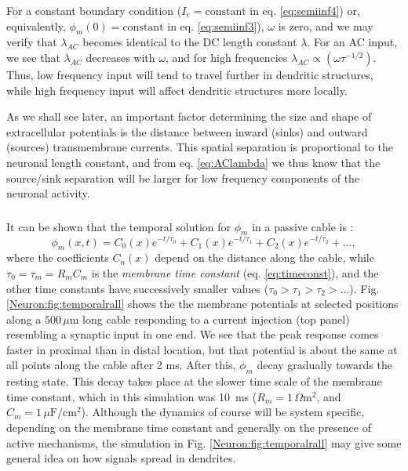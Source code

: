 For a constant boundary condition ($I_e = \text{constant}$ in eq. \ref{eq:semiinf4}) or, equivalently, $\phi_m(0) = \text{constant}$ in eq. \ref{eq:semiinf3}), $\omega$ is zero, and we may verify that $\lambda_{AC}$ becomes identical to the DC length constant $\lambda$. For an AC input, we see that $\lambda_{AC}$ decreases with $\omega$, and for high frequencies $\lambda_{AC} \propto (\omega \tau^{-1/2})$. Thus, low frequency input will tend to travel further in dendritic structures, while high frequency input will affect dendritic structures more locally. 

As we shall see later, an important factor determining the size and shape of extracellular potentials is the distance between inward (sinks) and outward (sources) transmembrane currents. This spatial separation is proportional to the neuronal length constant, and from eq. \ref{eq:AClambda} we thus know that the source/sink separation will be larger for low frequency components of the neuronal activity.


\subsubsection{}
It can be shown that the temporal solution for $\phi_m$ in a passive cable is \cite{rall1969}:
\begin{equation}
\phi_m(x,t) = C_0(x) e^{-t/\tau_0} + C_1(x) e^{-t/\tau_1} + C_2(x) e^{-t/\tau_2} + \ldots, 
\label{eq:cabletemporal}
\end{equation}
where the coefficients $C_n(x)$ depend on the distance along the cable, while $\tau_0 = \tau_m = R_m C_m$ is the \emph{membrane time constant} (eq. \ref{eq:timeconst}), and the other time constants have successively smaller values ($\tau_0 > \tau_1 > \tau_2 > \ldots$). Fig. \ref{Neuron:fig:temporalrall} shows the the membrane potentials at selected positions along a $500 \, \mu$m long cable responding to a current injection (top panel) resembling a synaptic input in one end. We see that the peak response comes faster in proximal than in distal location, but that potential is about the same at all points along the cable after 2 ms. After this, $\phi_m$  decay gradually towards the resting state. This decay takes place at the slower time scale of the membrane time constant, which in this simulation was 10~ms ($R_m=1\,\Omega \text{m}^2$, and $C_m=1\,\mu\text{F}/\text{cm}^2$). Although the dynamics of course will be system specific, depending on the membrane time constant and generally on the presence of active mechanisms, the simulation in Fig. \ref{Neuron:fig:temporalrall} may give some general idea on how signals spread in dendrites.

